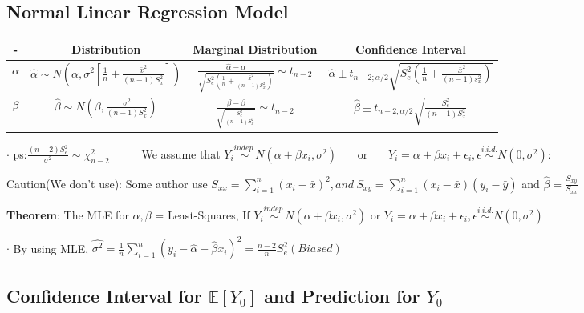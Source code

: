 \documentclass[9pt]{article}
\begin{document}
    \subsection{Normal Linear Regression Model}

    \vspace{-0.4cm}
    \begin{longtable}{|c|c|c|c|}
        \hline
        -        & Distribution                                                                    & Marginal Distribution                                                                            & Confidence Interval                                                                      \\
        \hline
        $\alpha$ & $\hat{\alpha}\sim N(\alpha,\sigma^2[\frac{1}{n}+\frac{\bar{x}^2}{(n-1)S^2_x}])$ & $\frac{\hat{\alpha}-\alpha}{\sqrt{S^2_e(\frac{1}{n}+\frac{\bar{x}^2}{(n-1)S^2_x})}}\sim t_{n-2}$ & $\hat{\alpha}\pm t_{n-2;\alpha/2}\sqrt{S^2_e(\frac{1}{n}+\frac{\bar{x}^2}{(n-1)s^2_x})}$ \\
        \hline
        $\beta$  & $\hat{\beta}\sim N(\beta,\frac{\sigma^2}{(n-1)S^2_x})$                          & $\frac{\hat{\beta}-\beta}{\sqrt{\frac{S^2_e}{(n-1)S^2_x}}}\sim t_{n-2}$                          & $\hat{\beta}\pm t_{n-2;\alpha/2}\sqrt{\frac{S^2_e}{(n-1)S^2_x}}$                         \\
        \hline
    \end{longtable}
    \vspace{-0.4cm}

$\cdot$ ps:$\frac{(n-2)S^2_e}{\sigma^2}\sim\chi^2_{n-2}$ \ \ \ \ \ We assume that $Y_i \stackrel{indep.}{\sim} N(\alpha +\beta x_i,\sigma^2)$ \ \ \ or \ \ \ $Y_i = \alpha + \beta x_i + \epsilon_i,\epsilon\stackrel{i.i.d.}{\sim}N(0,\sigma^2)$:

{\footnotesize Caution(We don't use): Some author use $S_{xx}=\sum_{i=1}^{n}(x_i-\bar{x})^2,and \ S_{xy}=\sum_{i=1}^{n}(x_i-\bar{x})(y_i-\bar{y})$ and $\hat{\beta}=\frac{S_{xy}}{S_{xx}}$}

    \textbf{Theorem}: The MLE for $\alpha,\beta$ = Least-Squares, If $Y_i \stackrel{indep.}{\sim} N(\alpha +\beta x_i,\sigma^2)$ or $Y_i = \alpha + \beta x_i + \epsilon_i,\epsilon\stackrel{i.i.d.}{\sim}N(0,\sigma^2)$

$\cdot$ By using MLE, $\widehat{\sigma^2}=\frac{1}{n}\sum_{i=1}^{n}(y_i-\hat{\alpha}-\hat{\beta}x_i)^2=\frac{n-2}{n}S^2_e (Biased)$ \ \ \ \ \ \

    \subsection{Confidence Interval for $\mathbb{E}[Y_0]$ and Prediction for $Y_0$}
\end{document}
